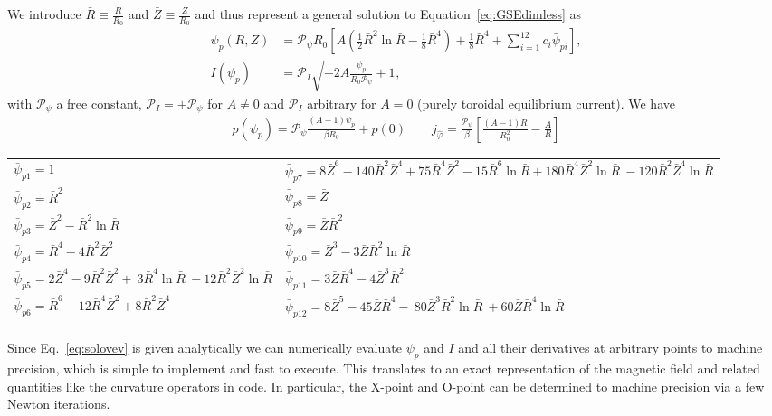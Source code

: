 We introduce \(\bar{R} \equiv \frac{R}{R_0}\) and \(\bar{Z} \equiv\frac{Z}{R_0}\)
and thus represent a general solution to Equation~\eqref{eq:GSEdimless} as~\cite{Cerfon2010}
\begin{subequations}
\label{eq:solovev}
\begin{align}
 \psi_p (R,Z) &= \mathcal P_{\psi} R_0 \left[ A\left( \frac{1}{2} \bar{R}^2 \ln{\bar{R}}
   - \frac{1}{8}\bar{R}^4\right)+ \frac{1}{8}\bar{R}^4
   + \sum_{i=1}^{12} c_{i}  \bar{\psi}_{pi}\right],\\
   I(\psi_p) &= \mathcal P_I\sqrt{ - 2A\frac{\psi_p}{R_0\mathcal P_{\psi}} +1},
\end{align}
\end{subequations}
with $\mathcal P_\psi$ a free constant, $\mathcal P_I = \pm \mathcal P_\psi$ for $A\neq 0$ and $\mathcal P_I$ arbitrary for $A=0$ (purely toroidal equilibrium current).
We have
\begin{align}
    p(\psi_p) = \mathcal P_\psi \frac{( A-1)\psi_p}{\beta R_0 } + p(0) \qquad
    j_{\hat\varphi} = \frac{\mathcal P_\psi}{\beta } \left[\frac{(A-1)R}{R_0^2} - \frac{A}{R}\right]
\end{align}
\begin{longtable}{>{\RaggedRight}p{7cm}>{\RaggedRight}p{7cm}}
\toprule
  $\bar{\psi}_{p1}=1$
  & $\bar{\psi}_{p7}=8\bar{Z}^6 -140 \bar{R}^2 \bar{Z}^4
                      + 75 \bar{R}^4 \bar{Z}^2 - 15\bar{R}^6\ln{\bar{R}}+ 180 \bar{R}^4 \bar{Z}^2 \ln{\bar{R}} \
                       -120 \bar{R}^2 \bar{Z}^4 \ln{\bar{R}}$\\
%
  $\bar{\psi}_{p2}=\bar{R}^2$ &
  $\bar{\psi}_{p8}=\bar{Z}$ \\
%
  $\bar{\psi}_{p3}=\bar{Z}^2 - \bar{R}^2 \ln{\bar{R}}$ &
  $\bar{\psi}_{p9}=\bar{Z}  \bar{R}^2$\\
%
  $\bar{\psi}_{p4}=\bar{R}^4 -4\bar{R}^2\bar{Z}^2$ &
  $\bar{\psi}_{p10}=\bar{Z}^3 - 3 \bar{Z} \bar{R}^2 \ln{\bar{R}}$\\
  $\bar{\psi}_{p5}=2\bar{Z}^4 - 9 \bar{R}^2\bar{Z}^2 + \
                     3 \bar{R}^4 \ln{\bar{R}} \
                    -12  \bar{R}^2\bar{Z}^2 \ln{\bar{R}}$
  &
$\bar{\psi}_{p11}=3 \bar{Z}\bar{R}^4 - 4\bar{Z}^3\bar{R}^2$\\
%
  $\bar{\psi}_{p6}=\bar{R}^6 -12 \bar{R}^4 \bar{Z}^2
                     + 8  \bar{R}^2 \bar{Z}^4$ &
  $\bar{\psi}_{p12}= 8 \bar{Z}^5 -45 \bar{Z} \bar{R}^4 - \
                       80 \bar{Z}^3 \bar{R}^2\ln{\bar{R}} \
                       +60 \bar{Z} \bar{R}^4\ln{\bar{R}}$ \\
   & \\
\bottomrule
\end{longtable}
Since Eq.~\eqref{eq:solovev} is given analytically we can numerically evaluate $\psi_p$ and $I$
and all their derivatives
at arbitrary points to machine precision, which is simple to implement and fast to execute.
This translates to an exact representation of the magnetic field and related
quantities like the curvature operators in code. In particular,
the X-point and O-point can be determined to machine
precision via a few Newton iterations.

